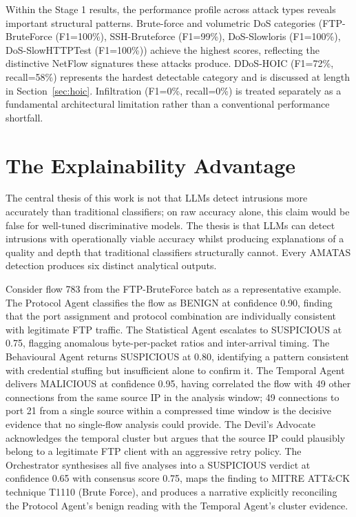 Within the Stage 1 results, the performance profile across attack types reveals important structural patterns. Brute-force and volumetric DoS categories (FTP-BruteForce (F1=100\%), SSH-Bruteforce (F1=99\%), DoS-Slowloris (F1=100\%), DoS-SlowHTTPTest (F1=100\%)) achieve the highest scores, reflecting the distinctive NetFlow signatures these attacks produce. DDoS-HOIC (F1=72\%, recall=58\%) represents the hardest detectable category and is discussed at length in Section~\ref{sec:hoic}. Infiltration (F1=0\%, recall=0\%) is treated separately as a fundamental architectural limitation rather than a conventional performance shortfall.

\section{The Explainability Advantage}

The central thesis of this work is not that LLMs detect intrusions more accurately than traditional classifiers; on raw accuracy alone, this claim would be false for well-tuned discriminative models. The thesis is that LLMs can detect intrusions with operationally viable accuracy whilst producing explanations of a quality and depth that traditional classifiers structurally cannot. Every AMATAS detection produces six distinct analytical outputs.

Consider flow 783 from the FTP-BruteForce batch as a representative example. The Protocol Agent classifies the flow as BENIGN at confidence 0.90, finding that the port assignment and protocol combination are individually consistent with legitimate FTP traffic. The Statistical Agent escalates to SUSPICIOUS at 0.75, flagging anomalous byte-per-packet ratios and inter-arrival timing. The Behavioural Agent returns SUSPICIOUS at 0.80, identifying a pattern consistent with credential stuffing but insufficient alone to confirm it. The Temporal Agent delivers MALICIOUS at confidence 0.95, having correlated the flow with 49 other connections from the same source IP in the analysis window; 49 connections to port 21 from a single source within a compressed time window is the decisive evidence that no single-flow analysis could provide. The Devil's Advocate acknowledges the temporal cluster but argues that the source IP could plausibly belong to a legitimate FTP client with an aggressive retry policy. The Orchestrator synthesises all five analyses into a SUSPICIOUS verdict at confidence 0.65 with consensus score 0.75, maps the finding to MITRE ATT\&CK technique T1110 (Brute Force), and produces a narrative explicitly reconciling the Protocol Agent's benign reading with the Temporal Agent's cluster evidence.

